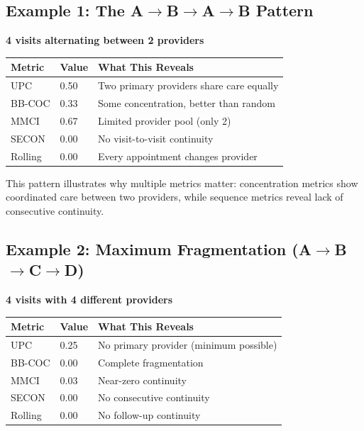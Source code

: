 \documentclass[11pt,a4paper]{article}
\begin{document}
\subsection{Example 1: The A$\rightarrow$B$\rightarrow$A$\rightarrow$B Pattern}

\textbf{4 visits alternating between 2 providers}

\begin{table}[h]
\centering
\begin{tabular}{lll}
\toprule
Metric & Value & What This Reveals \\
\midrule
UPC & 0.50 & Two primary providers share care equally \\
BB-COC & 0.33 & Some concentration, better than random \\
MMCI & 0.67 & Limited provider pool (only 2) \\
SECON & 0.00 & No visit-to-visit continuity \\
Rolling & 0.00 & Every appointment changes provider \\
\bottomrule
\end{tabular}
\end{table}

This pattern illustrates why multiple metrics matter: concentration metrics show coordinated care between two providers, while sequence metrics reveal lack of consecutive continuity.

\subsection{Example 2: Maximum Fragmentation (A$\rightarrow$B$\rightarrow$C$\rightarrow$D)}

\textbf{4 visits with 4 different providers}

\begin{table}[h]
\centering
\begin{tabular}{lll}
\toprule
Metric & Value & What This Reveals \\
\midrule
UPC & 0.25 & No primary provider (minimum possible) \\
BB-COC & 0.00 & Complete fragmentation \\
MMCI & 0.03 & Near-zero continuity \\
SECON & 0.00 & No consecutive continuity \\
Rolling & 0.00 & No follow-up continuity \\
\bottomrule
\end{tabular}
\end{table}
\end{document}
